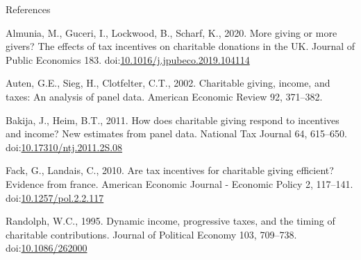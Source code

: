 \documentclass[
  ignorenonframetext,
  aspectratio=169,
]{beamer}
\newlength{\cslhangindent}
\newlength{\cslentryspacingunit} %
\newenvironment{CSLReferences}[2] %
 {%
  \setlength{\parindent}{0pt}
  \ifodd #1
  \let\oldpar\par
  \def\par{\hangindent=\cslhangindent\oldpar}
  \fi
  \setlength{\parskip}{#2\cslentryspacingunit}
 }%
 {}
\begin{document}
\begin{frame}[allowframebreaks]{References}
\hypertarget{refs}{}
\begin{CSLReferences}{1}{0}
\leavevmode{}%
Almunia, M., Guceri, I., Lockwood, B., Scharf, K., 2020. More giving or more givers? The effects of tax incentives on charitable donations in the UK. Journal of Public Economics 183. doi:\href{https://doi.org/10.1016/j.jpubeco.2019.104114}{10.1016/j.jpubeco.2019.104114}

\leavevmode{}%
Auten, G.E., Sieg, H., Clotfelter, C.T., 2002. Charitable giving, income, and taxes: An analysis of panel data. American Economic Review 92, 371--382.

\leavevmode{}%
Bakija, J., Heim, B.T., 2011. How does charitable giving respond to incentives and income? New estimates from panel data. National Tax Journal 64, 615--650. doi:\href{https://doi.org/10.17310/ntj.2011.2S.08}{10.17310/ntj.2011.2S.08}

\leavevmode{}%
Fack, G., Landais, C., 2010. Are tax incentives for charitable giving efficient? Evidence from france. American Economic Journal - Economic Policy 2, 117--141. doi:\href{https://doi.org/10.1257/pol.2.2.117}{10.1257/pol.2.2.117}

\leavevmode{}%
Randolph, W.C., 1995. Dynamic income, progressive taxes, and the timing of charitable contributions. Journal of Political Economy 103, 709--738. doi:\href{https://doi.org/10.1086/262000}{10.1086/262000}

\end{CSLReferences}
\end{frame}
\end{document}
